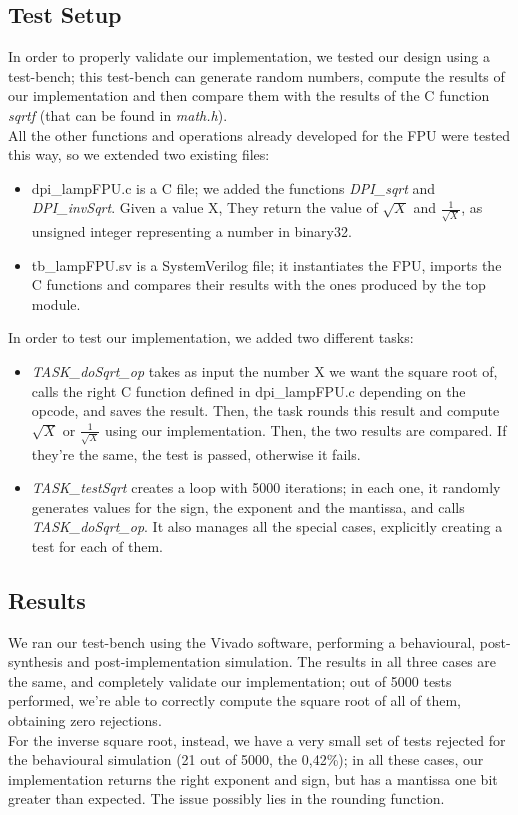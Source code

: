 \subsection{Test Setup}
In order to properly validate our implementation, we tested our design using a test-bench; this test-bench can generate random numbers, compute the results of our implementation and then compare them with the results of the C function \emph{sqrtf} (that can be found in \emph{math.h}).  \\
All the other functions and operations already developed for the FPU were tested this way, so we extended two existing files:
\begin{itemize}
\item dpi\_lampFPU.c is a C file; we added the functions \emph{DPI\_sqrt} and \emph{DPI\_invSqrt}. Given a value X, They return the value of $\sqrt{X}$ and $\frac{1}{\sqrt{X}}$, as unsigned integer representing a number in binary32.
\item tb\_lampFPU.sv is a SystemVerilog file; it instantiates the FPU, imports the C functions and compares their results with the ones produced by the top module. 
\end{itemize}

In order to test our implementation, we added two different tasks:
\begin{itemize}
\item \emph{TASK\_doSqrt\_op} takes as input the number X we want the square root of, calls the right C function defined in dpi\_lampFPU.c depending on the opcode, and saves the result. Then, the task rounds this result and compute $\sqrt{X}$ or $\frac{1}{\sqrt{X}}$ using our implementation. Then, the two results are compared. If they're the same, the test is passed, otherwise it fails. 
\item \emph{TASK\_testSqrt} creates a loop with 5000 iterations; in each one, it randomly generates values for the sign, the exponent and the mantissa, and calls \emph{TASK\_doSqrt\_op}. It also manages all the special cases, explicitly creating a test for each of them. 
\end{itemize}

\subsection{Results}
We ran our test-bench using the Vivado software, performing a behavioural, post-synthesis and post-implementation simulation. The results in all three cases are the same, and completely validate our implementation; out of 5000 tests performed, we're able to correctly compute the square root of all of them, obtaining zero rejections. \\
For the inverse square root, instead, we have a very small set of tests rejected for the behavioural simulation (21 out of 5000, the 0,42\%); in all these cases, our implementation returns the right exponent and sign, but has a mantissa one bit greater than expected. The issue possibly lies in the rounding function.  

